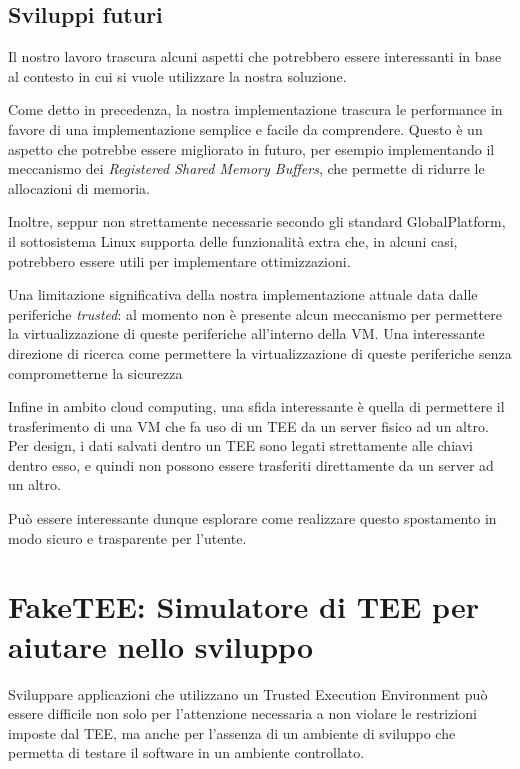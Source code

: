 \documentclass[12pt,italian]{report}
\begin{document}
\section{Sviluppi futuri}
\label{sec:sviluppi-futuri}
Il nostro lavoro trascura alcuni aspetti che potrebbero essere interessanti
in base al contesto in cui si vuole utilizzare la nostra soluzione.

Come detto in precedenza, la nostra implementazione trascura le performance in
favore di una implementazione semplice e facile da comprendere.
Questo è un aspetto che potrebbe essere migliorato in futuro, per esempio
implementando il meccanismo dei \textit{Registered Shared Memory Buffers},
che permette di ridurre le allocazioni di memoria.

Inoltre, seppur non strettamente necessarie secondo gli standard GlobalPlatform,
il sottosistema Linux supporta delle funzionalità extra che, in alcuni casi,
potrebbero essere utili per implementare ottimizzazioni.

\bigbreak \noindent

Una limitazione significativa della nostra implementazione attuale data dalle
periferiche \textit{trusted}: al momento non è presente alcun meccanismo per
permettere la virtualizzazione di queste periferiche all'interno della VM.
Una interessante direzione di ricerca come permettere la virtualizzazione
di queste periferiche senza comprometterne la sicurezza

\bigbreak \noindent

Infine in ambito cloud computing, una sfida interessante è quella di permettere
il trasferimento di una VM che fa uso di un TEE da un server fisico ad un altro.
Per design, i dati salvati dentro un TEE sono legati strettamente alle chiavi
dentro esso, e quindi non possono essere trasferiti direttamente da un
server ad un altro.

Può essere interessante dunque esplorare come realizzare questo spostamento
in modo sicuro e trasparente per l'utente.

\appendix
\chapter{FakeTEE: Simulatore di TEE per aiutare nello sviluppo}
\label{app:faketee}
Sviluppare applicazioni che utilizzano un Trusted Execution Environment può
essere difficile non solo per l'attenzione necessaria a non violare
le restrizioni imposte dal TEE, ma anche per l'assenza di un ambiente di
sviluppo che permetta di testare il software in un ambiente controllato.
\end{document}
